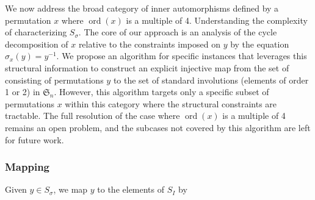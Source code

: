 \documentclass[oneside]{amsart}
\theoremstyle{plain}
\theoremstyle{definition}
\theoremstyle{remark}
\begin{document}
        We now address the broad category of inner automorphisms defined by a permutation $x$ where $\operatorname{ord}(x)$ is a multiple of 4. Understanding the complexity of characterizing $S_{\sigma}$. The core of our approach is an analysis of the cycle decomposition of $x$ relative to the constraints imposed on $y$ by the equation $\sigma_x(y) = y^{-1}$. We propose an algorithm for specific instances that leverages this structural information to construct an explicit injective map from the set of consisting of permutations $y$ to the set of standard involutions (elements of order 1 or 2) in $\mathfrak{S}_n$. However, this algorithm targets only a specific subset of permutations $x$ within this category where the structural constraints are tractable. The full resolution of the case where $\operatorname{ord}(x)$ is a multiple of 4 remains an open problem, and the subcases not covered by this algorithm are left for future work.
        \subsubsection{Mapping}
            Given $y \in S_\sigma$, we map $y$ to the elements of $S_I$ by
            
\end{document}
